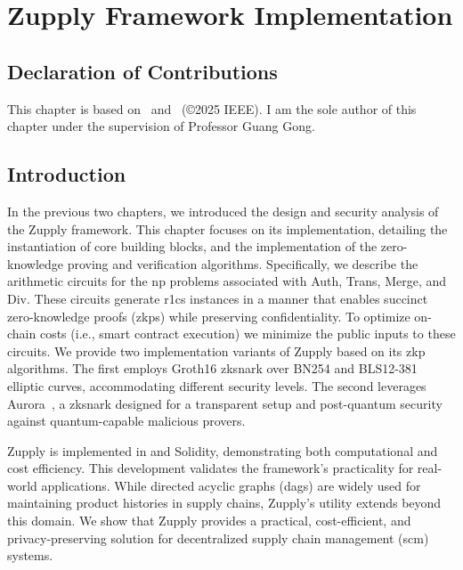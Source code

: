 \chapter{Zupply Framework Implementation}\label{ch:zupply_implementation}

\section*{Declaration of Contributions}
This chapter is based on~\cite{Badakhshan2024Zupply} and~\cite{Badakhshan2025AuroraZupply} (\copyright \hspace{.1em}2025 IEEE). I am the sole author of this chapter under the supervision of Professor Guang Gong.

\section{Introduction}

In the previous two chapters, we introduced the design and security analysis of the Zupply framework. This chapter focuses on its implementation, detailing the 
instantiation of core building blocks, and the implementation of the zero-knowledge proving and verification algorithms. Specifically, we describe the arithmetic circuits for the \gls{np} problems associated with \textsf{Auth}, \textsf{Trans}, \textsf{Merge}, and \textsf{Div}. These circuits generate \gls{r1cs} instances in a manner that enables succinct zero-knowledge proofs (\gls{zkp}s) while preserving confidentiality. To optimize on-chain costs (i.e., smart contract execution) we minimize the public inputs to these circuits. 
We provide two implementation variants of Zupply based on its \gls{zkp} algorithms. The first employs Groth16 \cite{Groth2016} \gls{zksnark} over BN254 \cite{BNcurve} and BLS12-381~\cite{BLS_curve2003} elliptic curves, accommodating different security levels. The second leverages Aurora~\cite{Aurora2019}, a \gls{zksnark} designed for a transparent setup and post-quantum security against quantum-capable malicious provers.

Zupply is implemented in \CC and Solidity, demonstrating both computational and cost efficiency. This development validates the framework's practicality for real-world applications. While directed acyclic graphs (\gls{dag}s) are widely used for maintaining product histories in supply chains, Zupply's utility extends beyond this domain. We show that Zupply provides a practical, cost-efficient, and privacy-preserving solution for decentralized supply chain management (\gls{scm}) systems.

